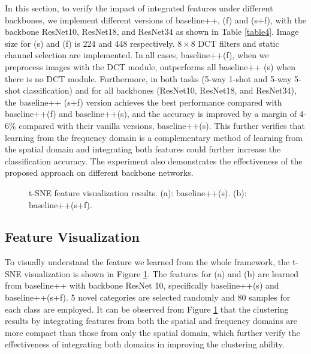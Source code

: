 \documentclass[10pt, conference, compsocconf]{IEEEtran}
\begin{document}
In this section, to verify the impact of integrated features under different backbones, we implement different versions of baseline++, (f) and (s+f), with the backbone ResNet10, ResNet18, and ResNet34 as shown in Table \ref{table4}. Image size for (s) and (f) is 224 and 448 respectively. $8\times 8$ DCT filters and static channel selection are implemented. In all cases, baseline++(f), when we preprocess images with the DCT module, outperforms all baseline++ (s) when there is no DCT module. Furthermore, in both tasks (5-way 1-shot and 5-way 5-shot classification) and for all backbones (ResNet10, ResNet18, and ResNet34), the baseline++ (s+f) version achieves the best performance compared with baseline++(f) and baseline++(s), and the accuracy is improved by a margin of 4-6$\%$ compared with their vanilla versions, baseline++(s).  This further verifies that learning from the frequency domain is a complementary method of learning from the spatial domain and integrating both features could further increase the classification accuracy. The experiment also demonstrates the effectiveness of the proposed approach on different backbone networks.



\begin{figure}[tb]
\begin{center}
\qquad
{}\end{center}
\caption{t-SNE feature visualization results. (a): baseline++(s).  (b): baseline++(s+f).}
\label{fig4}
\end{figure}

\subsection{Feature Visualization}

To visually understand the feature we learned from the whole framework, the t-SNE visualization \cite{maaten2008visualizing} is shown in Figure \ref{fig4}. The features for (a) and (b) are learned from baseline++ with backbone ResNet 10, specifically baseline++(s) and baseline++(s+f). 5 novel categories are selected randomly and 80 samples for each class are employed. It can be observed from Figure \ref{fig4} that the clustering results by integrating features from both the spatial and frequency domains are more compact than those from only the spatial domain, which further verify the effectiveness of integrating both domains in improving the clustering ability. 
\end{document}
